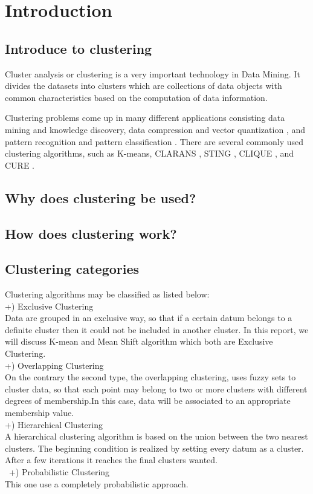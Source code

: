 \section{Introduction}
\subsection{Introduce to clustering}

\forceindent Cluster analysis or clustering is a very important technology in Data Mining. It divides the datasets into clusters which are collections of data objects with common characteristics based on the computation of data information.

Clustering problems come up in many different applications consisting data mining and knowledge discovery, data compression and vector quantization \cite{Gersho-vector}, and pattern recognition and pattern classification \cite{Kanugo-efficient}. There are several commonly used clustering algorithms, such as K-means, CLARANS \cite{Raymon-clarans}, STING \cite{Wang-sting}, CLIQUE \cite{Rakesh-Automatic}, and CURE \cite{Guha-cure}.


\subsection{Why does clustering be used?}

\subsection{How does clustering work?}

\subsection{Clustering categories}
Clustering algorithms may be classified as listed below:\\
+) Exclusive Clustering \\
Data are grouped in an exclusive way, so that if a certain datum belongs to a definite cluster then it could not be included in another cluster. In this report, we will discuss K-mean and Mean Shift algorithm which both are Exclusive Clustering.\\
+) Overlapping Clustering \\
On the contrary the second type, the overlapping clustering, uses fuzzy sets to cluster data, so that each point may belong to two or more clusters with different degrees of membership.In this case, data will be associated to an appropriate membership value.\\
 +) Hierarchical Clustering \\
A hierarchical clustering algorithm is based on the union between the two nearest clusters. The beginning condition is realized by setting every datum as a cluster. After a few iterations it reaches the final clusters wanted.\\\
 +) Probabilistic Clustering\\
This one use a completely probabilistic approach.
